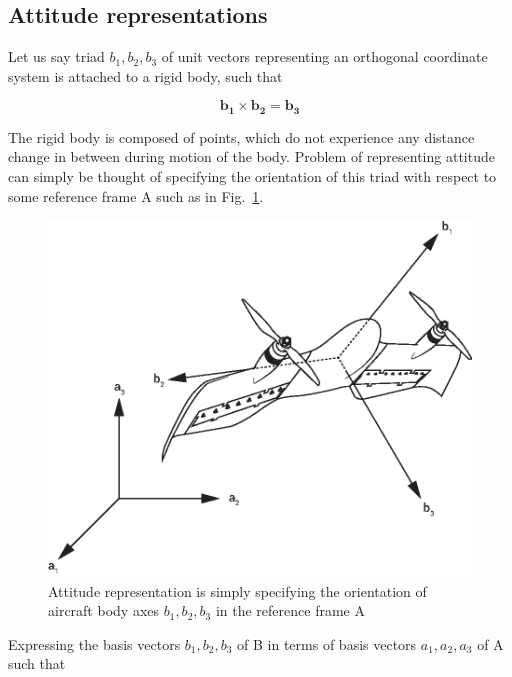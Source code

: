 \subsection{Attitude representations}
Let us say triad $b_1, b_2, b_3$ of unit vectors representing an orthogonal coordinate system is attached to a rigid body, such that

\begin{equation}
\label{eqn:unitVectors}
\bm{b_1}\times \bm{b_2}= \bm{b_3}
\end{equation}

The rigid body is composed of points, which do not experience any distance change in between during motion of the body. 
Problem of representing attitude can simply be thought of specifying the orientation of this triad with respect to some reference frame A such as in Fig.~\ref{fig:theTwoFrames}.

\begin{figure}
\begin{center}
\includegraphics[width=13cm]{figures/DarkoAxesElgiz}    %
\caption{Attitude representation is simply specifying the orientation of 
aircraft body axes $b_1, b_2, b_3$ in the reference frame A} 
\label{fig:theTwoFrames}
\end{center}
\end{figure}

Expressing the basis vectors $b_1, b_2, b_3$ of B in terms of basis vectors $a_1, a_2, a_3$ of A such that

